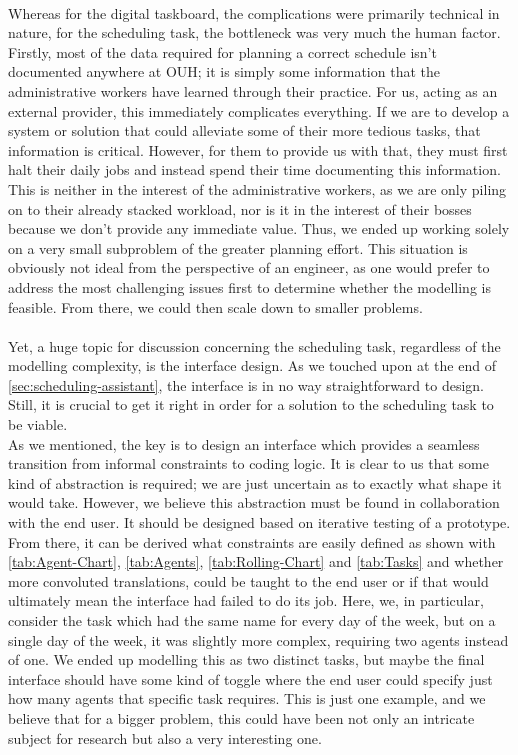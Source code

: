 \\
Whereas for the digital taskboard, the complications were primarily technical in nature, for the scheduling task, the bottleneck was very much the human factor.
\\
Firstly, most of the data required for planning a correct schedule isn't documented anywhere at OUH; it is simply some information that the administrative workers have learned through their practice. For us, acting as an external provider, this immediately complicates everything. If we are to develop a system or solution that could alleviate some of their more tedious tasks, that information is critical. However, for them to provide us with that, they must first halt their daily jobs and instead spend their time documenting this information. This is neither in the interest of the administrative workers, as we are only piling on to their already stacked workload, nor is it in the interest of their bosses because we don't provide any immediate value. Thus, we ended up working solely on a very small subproblem of the greater planning effort. This situation is obviously not ideal from the perspective of an engineer, as one would prefer to address the most challenging issues first to determine whether the modelling is feasible. From there, we could then scale down to smaller problems.
\\
\\
Yet, a huge topic for discussion concerning the scheduling task, regardless of the modelling complexity, is the interface design. As we touched upon at the end of \autoref{sec:scheduling-assistant}, the interface is in no way straightforward to design. Still, it is crucial to get it right in order for a solution to the scheduling task to be viable. 
\\
As we mentioned, the key is to design an interface which provides a seamless transition from informal constraints to coding logic. It is clear to us that some kind of abstraction is required; we are just uncertain as to exactly what shape it would take. However, we believe this abstraction must be found in collaboration with the end user. It should be designed based on iterative testing of a prototype. From there, it can be derived what constraints are easily defined as shown with \autoref{tab:Agent-Chart}, \autoref{tab:Agents}, \autoref{tab:Rolling-Chart} and \autoref{tab:Tasks} and whether more convoluted translations, could be taught to the end user or if that would ultimately mean the interface had failed to do its job. Here, we, in particular, consider the task which had the same name for every day of the week, but on a single day of the week, it was slightly more complex, requiring two agents instead of one. We ended up modelling this as two distinct tasks, but maybe the final interface should have some kind of toggle where the end user could specify just how many agents that specific task requires. This is just one example, and we believe that for a bigger problem, this could have been not only an intricate subject for research but also a very interesting one.
\\